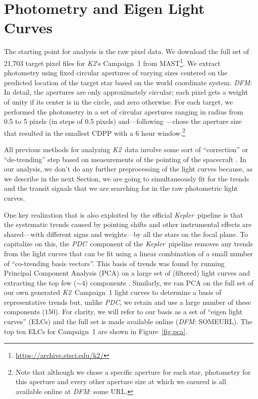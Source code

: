 \documentclass[12pt,preprint]{aastex}
\newcommand{\project}[1]{\textsl{#1}} %
\newcommand{\kepler}{\project{Kepler}}
\newcommand{\KT}{\project{K2}}
\newcommand{\pdc}{\project{PDC}}
\newcommand{\figref}[1]{\ref{fig:#1}}
\newcommand{\Fig}[1]{Figure~\figref{#1}}
\newcommand{\sectionname}{Section}
\newcommand{\sectlabel}[1]{\label{sect:#1}}
\newcommand{\todo}[3]{{\color{#2}\emph{#1}: #3}}
\newcommand{\dfmtodo}[1]{\todo{DFM}{red}{#1}}
\begin{document}
\section{Photometry and Eigen Light Curves}
\sectlabel{phot}

The starting point for analysis is the raw pixel data.
We download the full set of 21,703 target pixel files for \KT's Campaign~1
from MAST\footnote{\url{https://archive.stsci.edu/k2/}}.
We extract photometry using fixed circular apertures of varying sizes
centered on the predicted location of the target star based on the world
coordinate system.
\dfmtodo{In detail, the apertures are only approximately circular; each pixel
gets a weight of unity if its center is in the circle, and zero otherwise.}
For each target, we performed the photometry in a set of
circular apertures ranging in radius from 0.5 to
5 pixels (in steps of 0.5 pixels) and---following
\citet{Vanderburg:2014}---chose the aperture size that resulted in the
smallest CDPP \citep{cdpp}
with a 6 hour window.\footnote{Note that although we chose a specific
aperture for each star, photometry for this aperture and every other
aperture size at which we easured is all available online at
\dfmtodo{some URL}.}

All previous methods for analyzing \KT\ data involve some sort of
``correction'' or ``de-trending'' step based on measurements of the pointing
of the spacecraft \citep{Vanderburg:2014, Aigrain:2015,
Crossfield:2015}.
In our analysis, we don't do any further preprocessing of the light curves
because, as we describe in the next \sectionname, we are going to simultaneously fit for the
trends and the transit signals that we are searching for in the raw
photometric light curves.

One key realization that is also exploited by the official \kepler\ pipeline
is that the systematic trends caused by pointing shifts and other instrumental
effects are shared---with different signs and weights---by all the stars on
the focal plane.
To capitalize on this, the \pdc\ component of the \kepler\ pipeline
removes any trends from the light curves that can be fit using a linear
combination of a small number of ``co-trending basis vectors''.
This basis of trends was found by running Principal Component Analysis (PCA)
on a large set of (filtered) light curves and extracting the top few ($\sim 4$)
components \citep{pdc1, pdc2}.
Similarly, we ran PCA on the full set of our own generated \KT\ Campaign~1
light curves to determine a basis of representative trends but, unlike \pdc,
we retain and use a large number of these components ($150$).
For clarity, we will refer to our basis as a set of ``eigen light curves''
(ELCs) and the full set is made available online (\dfmtodo{SOMEURL}).
The top ten ELCs for Campaign~1 are shown in \Fig{pca}.
\end{document}
